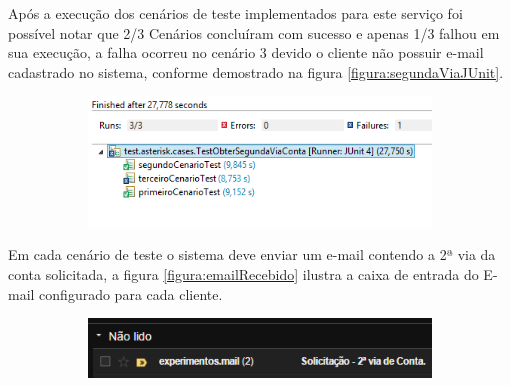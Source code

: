  Após a execução dos cenários de teste implementados para este serviço foi possível notar que 2/3 Cenários concluíram com sucesso e apenas 1/3 falhou em sua execução, a falha ocorreu no cenário 3 devido o cliente não possuir e-mail cadastrado no sistema, conforme demostrado na figura \ref{figura:segundaViaJUnit}.	
 \begin{figure}[H]
 	\centering
		\caption{\textbf{Obter 2ª Via de Conta - Detalhes execução dos testes}}
		\label{figura:segundaViaJUnit}
 	\begin{subfigure}[H]{\textwidth}
 		\centering
 		\includegraphics{figuras/cenarios/segunda_via/junit_result.PNG}
 	\end{subfigure}
 \end{figure}	
	

Em cada cenário de teste o sistema deve enviar um e-mail contendo a 2ª via da conta solicitada, a figura \ref{figura:emailRecebido} ilustra a caixa de entrada do E-mail configurado para cada cliente.
\begin{figure}[H]
	\centering
	\caption{\textbf{Obter 2ª Via de Conta - E-mail recebido pelo cliente}}
	\label{figura:emailRecebido}
	\begin{subfigure}[H]{\textwidth}
		\centering
		\includegraphics{figuras/cenarios/segunda_via/envio_email.PNG}
	\end{subfigure}
\end{figure}

	
\subsection{\fontsize{12}{1} }

